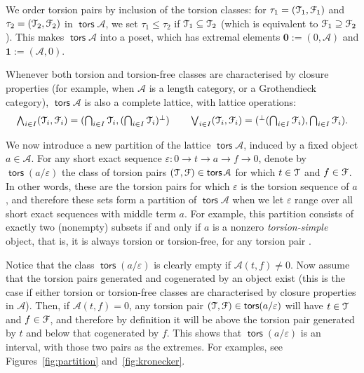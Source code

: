 \documentclass[a4paper,11pt]{amsart}
\theoremstyle{plain}
\theoremstyle{definition}
\newcommand{\Acal}{\mathcal{A}} \newcommand{\Bcal}{\mathcal{B}} \newcommand{\Ccal}{\mathcal{C}}
\renewcommand{\epsilon}{\varepsilon}
\DeclareMathOperator{\tors}{\mathsf{tors}}
\begin{document}
We order torsion
pairs by inclusion of the torsion classes: for $\tau_1=(\mathcal{T}_1,\mathcal{F}_1)$ and
$\tau_2=(\mathcal{T}_2,\mathcal{F}_2)$ in $\tors\Acal$, we set $\tau_1\leq \tau_2$ if
$\mathcal{T}_1\subseteq\mathcal{T}_2$ (which is equivalent to $\mathcal{F}_1\supseteq\mathcal{F}_2$).
This makes $\tors{\Acal}$ into a poset, which has extremal elements
$\mathbf{0}:=(0,\Acal)$ and $\mathbf{1}:=(\Acal,0)$.

Whenever both torsion and torsion-free classes are characterised by closure
properties (for example, when $\Acal$ is a length category, or a Grothendieck
category), $\tors\Acal$ is also a complete lattice, with lattice
operations:
\[\textstyle\bigwedge_{i\in I}(\mathcal{T}_i,\mathcal{F}_i)=(\bigcap_{i\in I}\mathcal{T}_i,(\bigcap_{i\in I}\mathcal{T}_i)^\bot)
\qquad
\bigvee_{i\in I}(\mathcal{T}_i,\mathcal{F}_i)=({}^\bot(\bigcap_{i\in
I}\mathcal{F}_i),\bigcap_{i\in I}\mathcal{F}_i).\] 

We now introduce a new partition of the lattice $\tors\Acal$, induced by a fixed
object $a\in\Acal$.
For any short exact sequence $\epsilon\colon 0\to t\to a\to f\to 0$,
denote by $\tors(a/\epsilon)$ the class of torsion pairs
$(\Tcal,\Fcal)\in\tors\Acal$ for which $t\in\mathcal{T}$ and $f\in\mathcal{F}$. In other
words, these are the torsion pairs for which $\epsilon$ is the torsion sequence
of $a$, and therefore these sets form a partition of $\tors\Acal$ when we let
$\epsilon$ range over all short exact sequences with middle term $a$.
For example, this partition consists of exactly two (nonempty)
subsets if and only if $a$ is a nonzero \emph{torsion-simple} object, that is,
it is always torsion or torsion-free, for any torsion pair \cite{pavo-25a}.

Notice that the class $\tors(a/\epsilon)$ is clearly empty if $\Acal(t,f)\neq
0$. Now assume that the torsion pairs generated and cogenerated by an object
exist (this is the case if either torsion or torsion-free classes are
characterised by closure properties in $\Acal$). Then, if $\Acal(t,f)=0$, any
torsion pair $(\Tcal,\Fcal)\in\tors(a/\epsilon)$ will have $t\in\mathcal{T}$ and
$f\in\mathcal{F}$, and therefore by definition it will be above the torsion pair
generated by $t$ and below that cogenerated by $f$. This shows that
$\tors(a/\epsilon)$ is an interval, with those two pairs as the extremes.
For examples, see Figures~\ref{fig:partition} and~\ref{fig:kronecker}.

\newcommand{\symb}[1] {%
	\IfEqCase{#1}{%
        {t}{\bullet}%
        {f}{\circ}%
				{m}{\ast}%
		}%
}
\newcommand{\ar}[6] %
	{\begin{smallmatrix}\symb#6\\[-2pt]\symb#4 \symb#5\\[-2pt]\symb#1 \symb#2 \symb#3\end{smallmatrix}}
\end{document}
